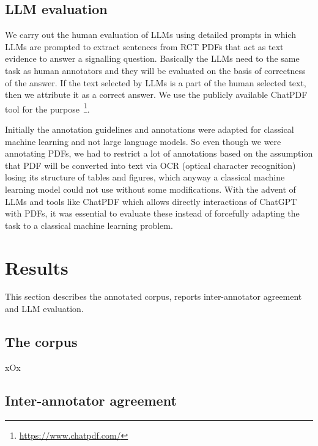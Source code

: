 \documentclass[sn-mathphys,Numbered]{sn-jnl}%
\theoremstyle{thmstyleone}%
\theoremstyle{thmstyletwo}%
\theoremstyle{thmstylethree}%
\begin{document}
\subsection{LLM evaluation}
\label{llms}
%
We carry out the human evaluation of LLMs using detailed prompts in which LLMs are prompted to extract sentences from RCT PDFs that act as text evidence to answer a signalling question.
Basically the LLMs need to the same task as human annotators and they will be evaluated on the basis of correctness of the answer.
If the text selected by LLMs is a part of the human selected text, then we attribute it as a correct answer.
We use the publicly available ChatPDF tool for the purpose~\footnote{\url{https://www.chatpdf.com/}}.


Initially the annotation guidelines and annotations were adapted for classical machine learning and not large language models.
So even though we were annotating PDFs, we had to restrict a lot of annotations based on the assumption that PDF will be converted into text via OCR (optical character recognition) losing its structure of tables and figures, which anyway a classical machine learning model could not use without some modifications.
With the advent of LLMs and tools like ChatPDF which allows directly interactions of ChatGPT with PDFs, it was essential to evaluate these instead of forcefully adapting the task to a classical machine learning problem.
%
%
%
\section{Results}
\label{sec:results}
%
This section describes the annotated corpus, reports inter-annotator agreement and LLM evaluation.

%
%
%
\subsection{The corpus}
\label{subsec:corpus}
%
xOx
%
%
%
\subsection{Inter-annotator agreement}
%
\end{document}

